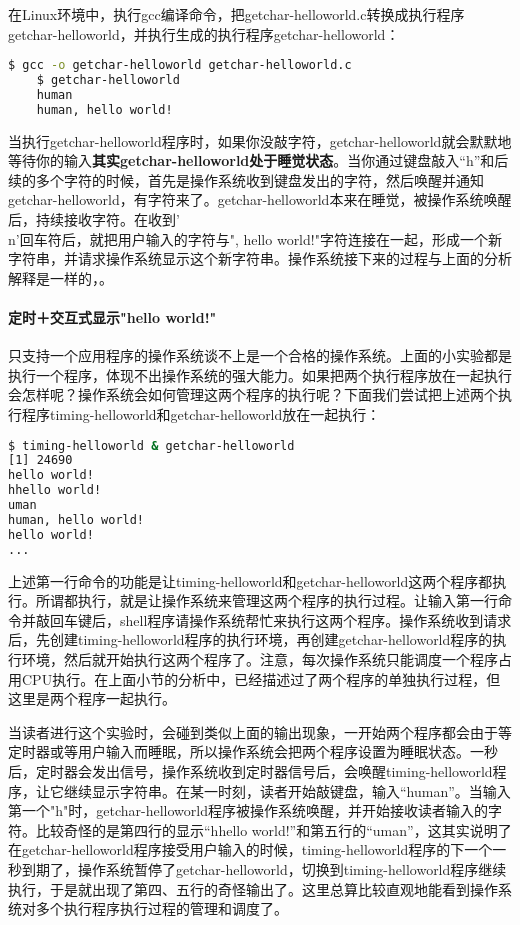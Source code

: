 在Linux环境中，执行gcc编译命令，把getchar-helloworld.c转换成执行程序getchar-helloworld，并执行生成的执行程序getchar-helloworld：
\begin{lstlisting}[language={bash}]
	$ gcc -o getchar-helloworld getchar-helloworld.c
	$ getchar-helloworld
	human
	human, hello world!	
\end{lstlisting}

当执行getchar-helloworld程序时，如果你没敲字符，getchar-helloworld就会默默地等待你的输入\textbf{其实getchar-helloworld处于睡觉状态}。当你通过键盘敲入“h”和后续的多个字符的时候，首先是操作系统收到键盘发出的字符，然后唤醒并通知getchar-helloworld，有字符来了。getchar-helloworld本来在睡觉，被操作系统唤醒后，持续接收字符。在收到'\\n'回车符后，就把用户输入的字符与", hello world!"字符连接在一起，形成一个新字符串，并请求操作系统显示这个新字符串。操作系统接下来的过程与上面的分析解释是一样的，。

\paragraph{定时＋交互式显示"hello world!"}
只支持一个应用程序的操作系统谈不上是一个合格的操作系统。上面的小实验都是执行一个程序，体现不出操作系统的强大能力。如果把两个执行程序放在一起执行会怎样呢？操作系统会如何管理这两个程序的执行呢？下面我们尝试把上述两个执行程序timing-helloworld和getchar-helloworld放在一起执行：
\begin{lstlisting}[language={bash}]
$ timing-helloworld & getchar-helloworld
[1] 24690
hello world!
hhello world!
uman
human, hello world!
hello world!
...
\end{lstlisting}

上述第一行命令的功能是让timing-helloworld和getchar-helloworld这两个程序都执行。所谓都执行，就是让操作系统来管理这两个程序的执行过程。让输入第一行命令并敲回车键后，shell程序请操作系统帮忙来执行这两个程序。操作系统收到请求后，先创建timing-helloworld程序的执行环境，再创建getchar-helloworld程序的执行环境，然后就开始执行这两个程序了。注意，每次操作系统只能调度一个程序占用CPU执行。在上面小节的分析中，已经描述过了两个程序的单独执行过程，但这里是两个程序一起执行。

当读者进行这个实验时，会碰到类似上面的输出现象，一开始两个程序都会由于等定时器或等用户输入而睡眠，所以操作系统会把两个程序设置为睡眠状态。一秒后，定时器会发出信号，操作系统收到定时器信号后，会唤醒timing-helloworld程序，让它继续显示字符串。在某一时刻，读者开始敲键盘，输入“human”。当输入第一个"h"时，getchar-helloworld程序被操作系统唤醒，并开始接收读者输入的字符。比较奇怪的是第四行的显示“hhello world!”和第五行的“uman”，这其实说明了在getchar-helloworld程序接受用户输入的时候，timing-helloworld程序的下一个一秒到期了，操作系统暂停了getchar-helloworld，切换到timing-helloworld程序继续执行，于是就出现了第四、五行的奇怪输出了。这里总算比较直观地能看到操作系统对多个执行程序执行过程的管理和调度了。

